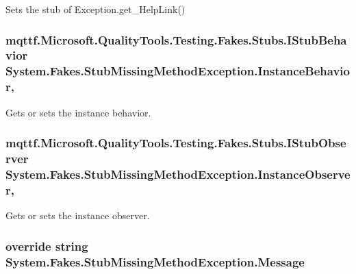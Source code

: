 Sets the stub of Exception.\-get\-\_\-\-Help\-Link()

\hypertarget{class_system_1_1_fakes_1_1_stub_missing_method_exception_a54231f091a50214c296d32f8c36edc5e}{
\subsubsection[{Instance\-Behavior}]{\setlength{\rightskip}{0pt plus 5cm}mqttf.\-Microsoft.\-Quality\-Tools.\-Testing.\-Fakes.\-Stubs.\-I\-Stub\-Behavior System.\-Fakes.\-Stub\-Missing\-Method\-Exception.\-Instance\-Behavior\hspace{0.3cm}{\ttfamily [get]}, {\ttfamily [set]}}}\label{class_system_1_1_fakes_1_1_stub_missing_method_exception_a54231f091a50214c296d32f8c36edc5e}


Gets or sets the instance behavior.

\hypertarget{class_system_1_1_fakes_1_1_stub_missing_method_exception_ac311360cb2b2f7df17860a44c6659315}{
\subsubsection[{Instance\-Observer}]{\setlength{\rightskip}{0pt plus 5cm}mqttf.\-Microsoft.\-Quality\-Tools.\-Testing.\-Fakes.\-Stubs.\-I\-Stub\-Observer System.\-Fakes.\-Stub\-Missing\-Method\-Exception.\-Instance\-Observer\hspace{0.3cm}{\ttfamily [get]}, {\ttfamily [set]}}}\label{class_system_1_1_fakes_1_1_stub_missing_method_exception_ac311360cb2b2f7df17860a44c6659315}


Gets or sets the instance observer.

\hypertarget{class_system_1_1_fakes_1_1_stub_missing_method_exception_ad2ff619e4da76bb5021c168c6cd793f9}{
\subsubsection[{Message}]{\setlength{\rightskip}{0pt plus 5cm}override string System.\-Fakes.\-Stub\-Missing\-Method\-Exception.\-Message\hspace{0.3cm}{\ttfamily [get]}}}\label{class_system_1_1_fakes_1_1_stub_missing_method_exception_ad2ff619e4da76bb5021c168c6cd793f9}


